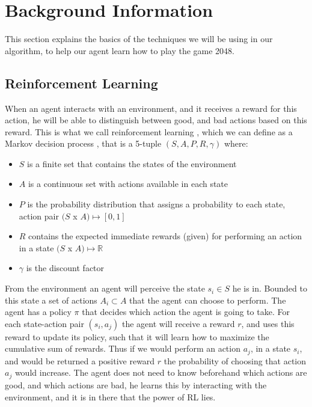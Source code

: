 \documentclass[a4paper,12pt]{article}
\begin{document}
\section{Background Information}
This section explains the basics of the techniques we will be using in our algorithm, to help our agent learn how to play the game 2048.
 
\subsection{Reinforcement Learning}
When an agent interacts with an environment, and it receives a reward for this action, he will be able to distinguish between good, and bad actions based on this reward. This is what we call reinforcement learning \cite{sutton1998rl}, which we can define as a Markov decision process \cite{howard1960mdp}, that is a 5-tuple $(S, A, P, R, \gamma)$ where:
\begin{itemize}
\item $S$ is a finite set that contains the states of the environment
\item $A$ is a continuous set with actions available in each state
\item $P$ is the probability distribution that assigns a probability to each state, action pair $(S$ x $A) \mapsto [0,1]$
\item $R$ contains the expected immediate rewards (given) for performing an action in a state $(S$ x $A) \mapsto \mathbb{R}$
\item $\gamma$ is the discount factor
\end{itemize}
From the environment an agent will perceive the state $s_{i} \in S$ he is in. Bounded to this state a set of actions $A_{i} \subset A$ that the agent can choose to perform. The agent has a policy $\pi$ that decides which action the agent is going to take. For each state-action pair $(s_{i}, a_{j})$ the agent will receive a reward $r$, and uses this reward to update its policy, such that it will learn how to maximize the cumulative sum of rewards. Thus if we would perform an action $a_{j}$, in a state $s_{i}$, and would be returned a positive reward $r$ the probability of choosing that action $a_{j}$ would increase. The agent does not need to know beforehand which actions are good, and which actions are bad, he learns this by interacting with the environment, and it is in there that the power of RL lies.
\end{document}
